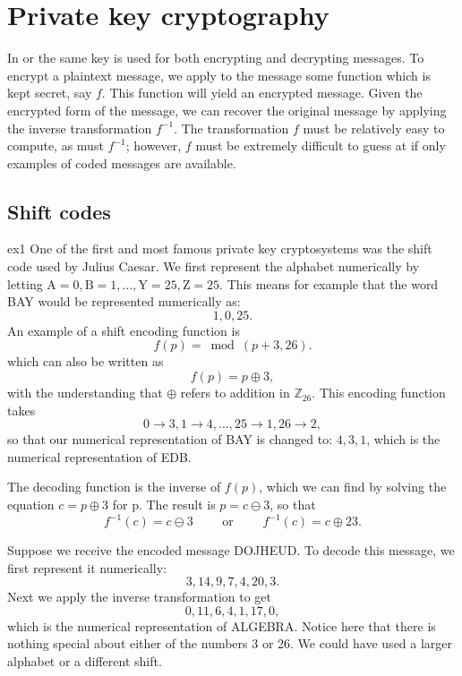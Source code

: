  
 
\section{Private key cryptography}
 
 
In  or
the same key is used for both encrypting and decrypting messages. To
encrypt a  plaintext message, we apply to the message some function
which is kept secret, say $f$. This function will yield an encrypted
message.  Given the encrypted form of the message, we can recover the
original message by applying the inverse transformation $f^{-1}$. The
transformation $f$ must be relatively easy to compute, as must
$f^{-1}$; however, $f$ must be extremely difficult to guess at if only
examples of coded messages are available.
 
\subsection{Shift codes} 
 
\begin{example}{ex1}
One of the first and most famous private key cryptosystems was the
shift code used by Julius Caesar.  We first represent the alphabet numerically by
letting $\mbox{A}  = 0, \mbox{B}  = 1, \ldots, \mbox{Y} = 25, \mbox{Z} = 25$. This means for example that the word BAY would be represented numerically as:
$$ 1,0,25.$$
An example of a shift encoding function is
$$
f(p) =\bmod( p + 3,  26).
$$
which can also be written as
$$
f(p) =p \oplus 3,
$$
with the understanding that $\oplus$ refers to addition in $\mathbb{Z}_{26}$. This encoding function takes 
$$0 \rightarrow 3, 1 \rightarrow 4, \ldots, 25 \rightarrow 1,26 \rightarrow 2,$$
so that our numerical representation of BAY is changed to:  $ 4,3,1$, which is the numerical representation of EDB.

The decoding
function is the inverse of $f(p)$, which we can find by solving the equation $c = p \oplus 3$ for p.
The result is $p = c \ominus 3$, so that
$$
f^{-1}(c) = c \ominus 3 \qquad \textrm{ or }\qquad f^{-1}(c) = c \oplus 23.
$$

Suppose we receive the encoded message DOJHEUD. To decode this
message, we first represent it numerically:  
$$
3, 14, 9, 7, 4, 20, 3.
$$
Next we apply the inverse transformation to get
$$
0, 11, 6, 4, 1, 17, 0,
$$
which is the numerical representation of ALGEBRA. Notice here that there is nothing special about either of
the numbers 3 or 26. We could have used a larger alphabet or a
different shift.
\mbox{\hspace{1in}}
\end{example}

